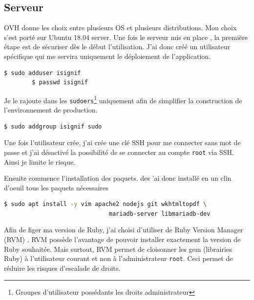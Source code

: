 \documentclass[]{report}
\begin{document}
    \subsection{Serveur}

      OVH donne les choix entre plusieurs OS et plusieurs distributions. Mon choix s’est porté sur Ubuntu 18.04 server. Une fois le serveur mis en place , la première étape est de sécuriser dès le début l’utilisation. J’ai donc créé un utilisateur spécifique qui me servira uniquement le déploiement de l’application.

      \begin{scriptsize}
        \begin{lstlisting}[language=bash]
        $ sudo adduser isignif
        $ passwd isignif
        \end{lstlisting}
      \end{scriptsize}

      Je le rajoute dans les \verb|sudoers|\footnote{Groupes d’utilisateur possédants les droits administrateur} uniquement afin de simplifier la construction de l’environnement de production.

      \begin{scriptsize}
        \begin{lstlisting}[language=bash]
        $ sudo addgroup isignif sudo
        \end{lstlisting}
      \end{scriptsize}

      Une fois l’utilisateur crée, j’ai crée une clé SSH pour me connecter sans mot de passe et j’ai désactivé la possibilité de se connecter au compte \verb|root| via SSH. Ainsi je limite le risque.

      Ensuite commence l’installation des paquets. des ’ai donc installé en un clin d’oeuil tous les paquets nécessaires

      \begin{scriptsize}
        \begin{lstlisting}[language=bash]
        $ sudo apt install -y vim apache2 nodejs git wkhtmltopdf \
                              mariadb-server libmariadb-dev
        \end{lstlisting}
      \end{scriptsize}

      Afin de figer ma version de Ruby, j’ai choisi d’utiliser de Ruby Version Manager (RVM) . RVM possède l’avantage de pouvoir installer exactement la version de Ruby souhaitée. Mais surtout, RVM permet de cloisonner les gem (librairies Ruby) à l’utilisateur courant et non à l’administrateur \verb|root|. Ceci permet de réduire les risques d’escalade de droits.
\end{document}
